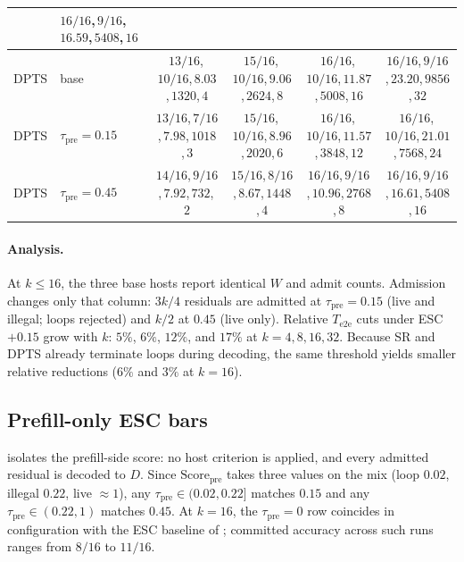 \begin{table}[t]
\begin{tabular}{@{}llcccc@{}}
 & $16/16$,\,$9/16$,\,$16.59$,\,$5408$,\,$16$ \\
\midrule
DPTS
 & base
 & $13/16$,\,$10/16$,\,$8.03$,\,$1320$,\,$4$
 & $15/16$,\,$10/16$,\,$9.06$,\,$2624$,\,$8$
 & $16/16$,\,$10/16$,\,$11.87$,\,$5008$,\,$16$
 & $16/16$,\,$9/16$,\,$23.20$,\,$9856$,\,$32$ \\
\rowcolor{tblalt}
DPTS
 & $\tau_{\mathrm{pre}}{=}0.15$
 & $13/16$,\,$7/16$,\,$7.98$,\,$1018$,\,$3$
 & $15/16$,\,$10/16$,\,$8.96$,\,$2020$,\,$6$
 & $16/16$,\,$10/16$,\,$11.57$,\,$3848$,\,$12$
 & $16/16$,\,$10/16$,\,$21.01$,\,$7568$,\,$24$ \\
DPTS
 & $\tau_{\mathrm{pre}}{=}0.45$
 & $14/16$,\,$9/16$,\,$7.92$,\,$732$,\,$2$
 & $15/16$,\,$8/16$,\,$8.67$,\,$1448$,\,$4$
 & $16/16$,\,$9/16$,\,$10.96$,\,$2768$,\,$8$
 & $16/16$,\,$9/16$,\,$16.61$,\,$5408$,\,$16$ \\
\bottomrule
\end{tabular}
\end{table}

\paragraph{Analysis.}
At $k\le16$, the three base hosts report identical $W$ and admit counts.
Admission changes only that column: $3k/4$ residuals are admitted at $\tau_{\mathrm{pre}}{=}0.15$
(live and illegal; loops rejected) and $k/2$ at $0.45$ (live only).
Relative $T_{\mathrm{e2e}}$ cuts under ESC${+}0.15$ grow with $k$:
$5\%$, $6\%$, $12\%$, and $17\%$ at $k{=}4,8,16,32$.
Because SR and DPTS already terminate loops during decoding, the same threshold yields smaller relative reductions
($6\%$ and $3\%$ at $k{=}16$).

\subsection{Prefill-only ESC bars}
\label{sec:ablate-prefill}

 isolates the prefill-side score: no host criterion is applied, and every admitted residual is decoded to $D$.
Since $\mathrm{Score}_{\mathrm{pre}}$ takes three values on the mix (loop $0.02$, illegal $0.22$, live $\approx1$), any $\tau_{\mathrm{pre}}\in(0.02,0.22]$ matches $0.15$ and any $\tau_{\mathrm{pre}}\in(0.22,1)$ matches $0.45$.
At $k{=}16$, the $\tau_{\mathrm{pre}}{=}0$ row coincides in configuration with the ESC baseline of ; committed accuracy across such runs ranges from $8/16$ to $11/16$.

